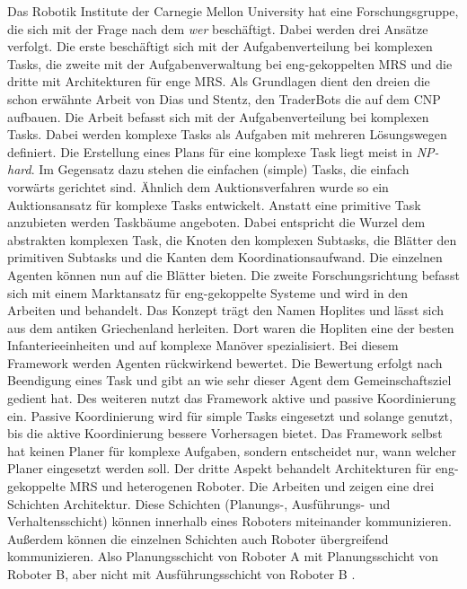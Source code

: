 Das Robotik Institute der Carnegie Mellon University hat eine Forschungsgruppe, die sich mit der Frage nach dem \textit{wer} beschäftigt. Dabei werden drei Ansätze verfolgt. Die erste beschäftigt sich mit der Aufgabenverteilung bei komplexen Tasks, die zweite mit der Aufgabenverwaltung bei eng-gekoppelten MRS und die dritte mit Architekturen für enge MRS. Als Grundlagen dient den dreien die schon erwähnte Arbeit von Dias und Stentz, den TraderBots\cite{dias2000market} die auf dem CNP aufbauen. Die Arbeit \cite{zlot2005complex} befasst sich mit der Aufgabenverteilung bei komplexen Tasks. Dabei werden komplexe Tasks als Aufgaben mit mehreren Lösungswegen definiert. Die Erstellung eines Plans für eine komplexe Task liegt meist in \textit{NP-hard}. Im Gegensatz dazu stehen die einfachen (simple) Tasks, die einfach vorwärts gerichtet sind. Ähnlich dem Auktionsverfahren wurde so ein Auktionsansatz für komplexe Tasks entwickelt. Anstatt eine primitive Task anzubieten werden Taskbäume angeboten. Dabei entspricht die Wurzel dem abstrakten komplexen Task, die Knoten den komplexen Subtasks, die Blätter den primitiven Subtasks und die Kanten dem Koordinationsaufwand. Die einzelnen Agenten können nun auf die Blätter bieten. Die zweite Forschungsrichtung befasst sich mit einem Marktansatz für eng-gekoppelte Systeme und wird in den Arbeiten \cite{kalra2004hoplites} und \cite{kalra2005hoplites} behandelt. Das Konzept trägt den Namen Hoplites und lässt sich aus dem antiken Griechenland herleiten. Dort waren die Hopliten eine der besten Infanterieeinheiten und auf komplexe Manöver spezialisiert. Bei diesem Framework werden Agenten rückwirkend bewertet. Die Bewertung erfolgt nach Beendigung eines Task und gibt an wie sehr dieser Agent dem Gemeinschaftsziel gedient hat. Des weiteren nutzt das Framework aktive und passive Koordinierung ein. Passive Koordinierung wird für simple Tasks eingesetzt und solange genutzt, bis die aktive Koordinierung bessere Vorhersagen bietet. Das Framework selbst hat keinen Planer für komplexe Aufgaben, sondern entscheidet nur, wann welcher Planer eingesetzt werden soll. Der dritte Aspekt behandelt Architekturen für eng-gekoppelte MRS und heterogenen Roboter. Die Arbeiten \cite{simmons2001first} und \cite{simmons2002layered} zeigen eine drei Schichten Architektur. Diese Schichten (Planungs-, Ausführungs- und Verhaltensschicht) können innerhalb eines Roboters miteinander kommunizieren. Außerdem können die einzelnen Schichten auch Roboter übergreifend kommunizieren. Also Planungsschicht von Roboter A mit Planungsschicht von Roboter B, aber nicht mit Ausführungsschicht von Roboter B \citep{lundh2006plan}.

